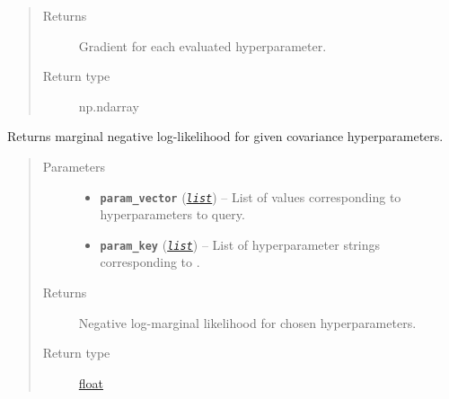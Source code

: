 \documentclass[letterpaper,10pt,english]{sphinxmanual}
\begin{document}
\begin{fulllineitems}
\begin{fulllineitems}
\begin{quote}
\begin{description}
\begin{itemize}
\end{itemize}

\item[{Returns}] \leavevmode
Gradient for each evaluated hyperparameter.

\item[{Return type}] \leavevmode
np.ndarray

\end{description}\end{quote}

\end{fulllineitems}


\begin{fulllineitems}
\label{pyGPGO.surrogates.GaussianProcess:pyGPGO.surrogates.GaussianProcess.GaussianProcess._lmlik}
Returns marginal negative log-likelihood for given covariance hyperparameters.
\begin{quote}\begin{description}
\item[{Parameters}] \leavevmode\begin{itemize}
\item {} 
\textbf{\texttt{param\_vector}} (\href{https://docs.python.org/2/library/functions.html\#list}{\emph{\texttt{list}}}) -- List of values corresponding to hyperparameters to query.

\item {} 
\textbf{\texttt{param\_key}} (\href{https://docs.python.org/2/library/functions.html\#list}{\emph{\texttt{list}}}) -- List of hyperparameter strings corresponding to .

\end{itemize}

\item[{Returns}] \leavevmode
Negative log-marginal likelihood for chosen hyperparameters.

\item[{Return type}] \leavevmode
\href{https://docs.python.org/2/library/functions.html\#float}{float}

\end{description}\end{quote}

\end{fulllineitems}



\end{fulllineitems}
\end{document}
